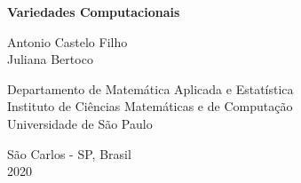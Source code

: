 \documentclass[10pt,twoside]{book}
\begin{document}
\pagestyle{myheadings}

\pagebreak \vspace*{.7cm}

\thispagestyle{empty}

\begin{center}

\Huge{\bf{Variedades Computacionais}} \\

\vspace*{3cm}

\large{Antonio Castelo Filho}\\ 
\large{Juliana Bertoco} \\

\vspace*{0.5cm}

\normalsize{Departamento de Matemática Aplicada e Estatística}\\
\normalsize{Instituto de Ciências Matemáticas e de Computação}\\   %
\normalsize{Universidade de São Paulo}

\end{center}


\begin{center}São Carlos - SP, Brasil\\ 2020
\end{center}

\newpage

\thispagestyle{empty}

\tableofcontents

\newpage


%
 



\printindex
\end{document}
